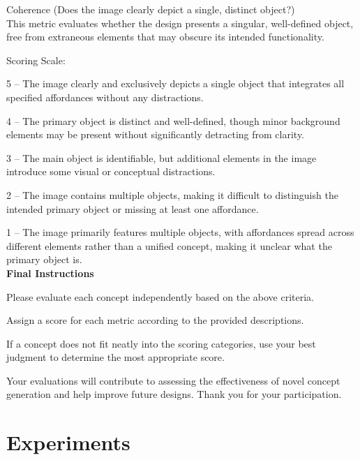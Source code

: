 \begin{tcolorbox}[colback=gray!10, colframe=black, title=Human Evaluation Instruction (continued)]
Coherence (Does the image clearly depict a single, distinct object?) \\
This metric evaluates whether the design presents a singular, well-defined object, free from extraneous elements that may obscure its intended functionality.


Scoring Scale:



5 – The image clearly and exclusively depicts a single object that integrates all specified affordances without any distractions.

4 – The primary object is distinct and well-defined, though minor background elements may be present without significantly detracting from clarity.

3 – The main object is identifiable, but additional elements in the image introduce some visual or conceptual distractions.

2 – The image contains multiple objects, making it difficult to distinguish the intended primary object or missing at least one affordance.

1 – The image primarily features multiple objects, with affordances spread across different elements rather than a unified concept, making it unclear what the primary object is. \\



\textbf{Final Instructions}

Please evaluate each concept independently based on the above criteria.

Assign a score for each metric according to the provided descriptions.

If a concept does not fit neatly into the scoring categories, use your best judgment to determine the most appropriate score.


Your evaluations will contribute to assessing the effectiveness of novel concept generation and help improve future designs. Thank you for your participation.


\end{tcolorbox}

\section{Experiments}
